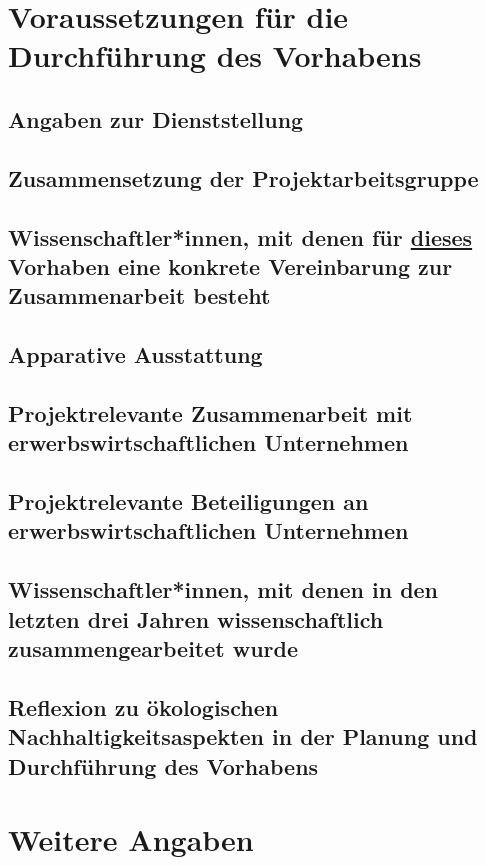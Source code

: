 \documentclass[german, 53.02]{proposal}
\begin{document}
\section{Voraussetzungen für die Durchführung des Vorhabens}

\subsection{Angaben zur Dienststellung}

\subsection{Zusammensetzung der Projektarbeitsgruppe}

\subsection{Wissenschaftler*innen, mit denen für \underline{dieses} Vorhaben eine konkrete Vereinbarung zur Zusammenarbeit besteht}

\subsection{Apparative Ausstattung}

\subsection{Projektrelevante Zusammenarbeit mit erwerbswirtschaftlichen Unternehmen}

\subsection{Projektrelevante Beteiligungen an erwerbswirtschaftlichen Unternehmen}

\subsection{Wissenschaftler*innen, mit denen in den letzten drei Jahren wissenschaftlich zusammengearbeitet wurde}

\subsection{Reflexion zu ökologischen Nachhaltigkeitsaspekten in der Planung und Durchführung des Vorhabens}


\section{Weitere Angaben}
\end{document}
